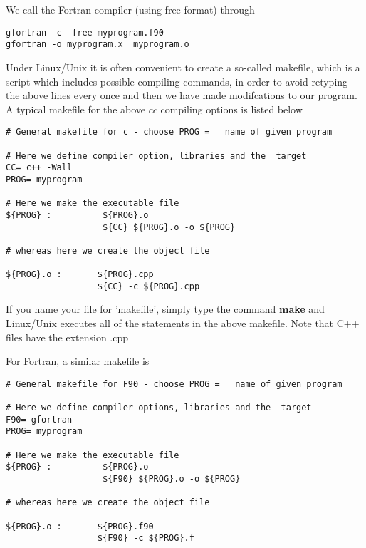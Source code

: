 We call the Fortran compiler (using free format) through 
\begin{svgraybox}
\begin{verbatim}
gfortran -c -free myprogram.f90
gfortran -o myprogram.x  myprogram.o
\end{verbatim}
\end{svgraybox}
Under Linux/Unix it is often convenient to create a
so-called makefile, which is a script which includes possible
compiling commands, in order to avoid retyping the above lines
every once and then we have made modifcations to our program.
A typical makefile for the above $cc$ compiling options is listed
below
\begin{svgraybox}
\begin{verbatim}
# General makefile for c - choose PROG =   name of given program

# Here we define compiler option, libraries and the  target
CC= c++ -Wall
PROG= myprogram

# Here we make the executable file 
${PROG} :          ${PROG}.o
                   ${CC} ${PROG}.o -o ${PROG}

# whereas here we create the object file

${PROG}.o :       ${PROG}.cpp
                  ${CC} -c ${PROG}.cpp

\end{verbatim}   
\end{svgraybox}                                            
If you name your file for 'makefile', simply type the command
{\bf make} and Linux/Unix executes all of the statements in the above
makefile. Note that C++ files have the extension .cpp

For Fortran, a similar makefile is
\begin{svgraybox}
\begin{verbatim}
# General makefile for F90 - choose PROG =   name of given program

# Here we define compiler options, libraries and the  target
F90= gfortran 
PROG= myprogram

# Here we make the executable file 
${PROG} :          ${PROG}.o
                   ${F90} ${PROG}.o -o ${PROG}

# whereas here we create the object file

${PROG}.o :       ${PROG}.f90
                  ${F90} -c ${PROG}.f
\end{verbatim}                                               
\end{svgraybox}

